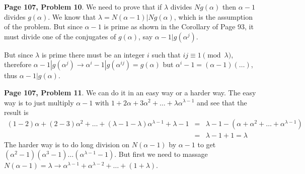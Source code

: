 \documentclass[aps,preprint,preprintnumbers,nofootinbib,showpacs,prd]{revtex4-1}
\newcommand{\nbea}{\begin{eqnarray*}}
\newcommand{\neea}{\end{eqnarray*}}
\begin{document}
{\bf Page 107, Problem 10}. We need to prove that if $\lambda$ divides $Ng(\alpha)$ then $\alpha - 1$ divides $g(\alpha)$. We know that $\lambda = N(\alpha - 1) | Ng(\alpha)$, which is the assumption of the problem. But since $\alpha - 1$ is prime as shown in the Corollary of Page 93, it must divide one of the conjugates of $g(\alpha)$, say $\alpha - 1 | g(\alpha^j)$.

But since $\lambda$ is prime there must be an integer $i$ such that $ij \equiv 1 \pmod{\lambda}$, therefore $\alpha - 1|g(\alpha^j) \to \alpha^i - 1 | g(\alpha^{ij}) = g(\alpha)$ but $\alpha^i - 1 = (\alpha - 1)(\dots)$, thus $\alpha - 1|g(\alpha)$.

{\bf Page 107, Problem 11}. We can do it in an easy way or a harder way. The easy way is to just multiply $\alpha - 1$ with $1 + 2\alpha + 3\alpha^2 + \dots + \lambda \alpha^{\lambda - 1}$ and see that the result is
%
\nbea
(1-2) \alpha + (2-3)\alpha^2 + \dots + (\lambda - 1 - \lambda)\alpha^{\lambda - 1} + \lambda - 1 & = & \lambda - 1 - (\alpha + \alpha^2 + \dots + \alpha^{\lambda - 1}) \\
& = & \lambda - 1 + 1 = \lambda
\neea
%
The harder way is to do long division on $N(\alpha - 1)$ by $\alpha - 1$ to get $(\alpha^2 - 1)(\alpha^3 - 1) \dots (\alpha^{\lambda - 1} - 1)$. But first we need to massage $N(\alpha - 1) = \lambda \to \alpha^{\lambda-1} + \alpha^{\lambda - 2} + \dots + (1 + \lambda)$.
\end{document}
